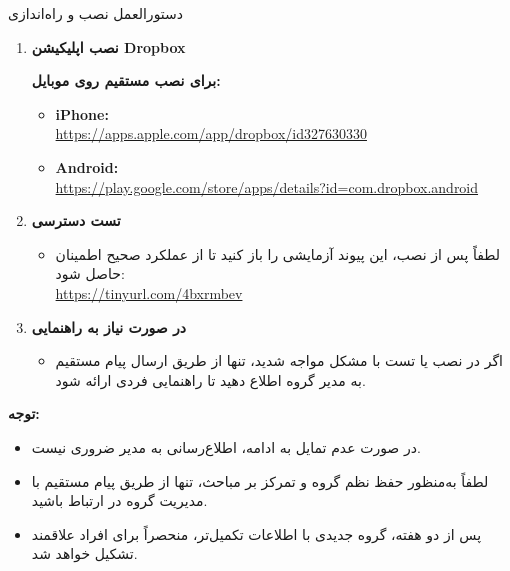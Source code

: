 \documentclass[10pt]{report}
\newcommand{\highlight}[1]{\textcolor{primaryBlue}{\textbf{#1}}}
\begin{document}
\begin{warningbox}{دستورالعمل نصب و راه‌اندازی}
\begin{enumerate}[leftmargin=*,label=\textcolor{primaryBlue}{\textbf{\arabic*.}}, itemsep=10pt, parsep=5pt]
  \item \highlight{نصب اپلیکیشن Dropbox}
  
  \textbf{برای نصب مستقیم روی موبایل:}
  
  \begin{itemize}[label={\textcolor{accentBlue}{\textbullet}}]
    \item \textbf{iPhone:} \\
    \url{https://apps.apple.com/app/dropbox/id327630330}
    
    \item \textbf{Android:} \\
    \url{https://play.google.com/store/apps/details?id=com.dropbox.android}
  \end{itemize}
  
  \vspace{6pt}
  \item \highlight{تست دسترسی}
  \begin{itemize}[label={\textcolor{accentBlue}{\textbullet}}]
    \item لطفاً پس از نصب، این پیوند آزمایشی را باز کنید تا از عملکرد صحیح اطمینان حاصل شود:\\
    \url{https://tinyurl.com/4bxrmbev}
  \end{itemize}
  
  \vspace{6pt}
  \item \highlight{در صورت نیاز به راهنمایی}
  \begin{itemize}[label={\textcolor{accentBlue}{\textbullet}}]
    \item اگر در نصب یا تست با مشکل مواجه شدید، تنها از طریق ارسال پیام مستقیم به مدیر گروه اطلاع دهید تا راهنمایی فردی ارائه شود.
  \end{itemize}
\end{enumerate}

\vspace{1em}
\begin{simpleframe}
\textbf{توجه:}
\begin{itemize}[label={\textcolor{warningOrange}{\textbullet}}]
  \item در صورت عدم تمایل به ادامه، اطلاع‌رسانی به مدیر ضروری نیست.
  \item لطفاً به‌منظور حفظ نظم گروه و تمرکز بر مباحث، تنها از طریق پیام مستقیم با مدیریت گروه در ارتباط باشید.
  \item پس از دو هفته، گروه جدیدی با اطلاعات تکمیل‌تر، منحصراً برای افراد علاقمند تشکیل خواهد شد.
\end{itemize}
\end{simpleframe}
\end{warningbox}
\end{document}
